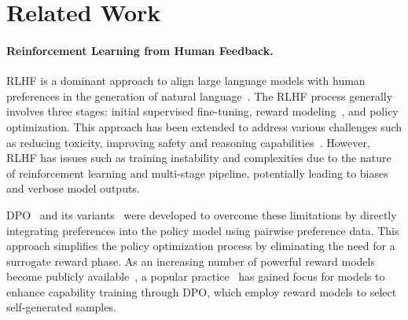 \section{Related Work}

\paragraph{Reinforcement Learning from Human Feedback.} 
RLHF is a dominant approach to align large language models with human preferences in the generation of natural language~\cite{NEURIPS2022_b1efde53, touvron2023llama2openfoundation}. 
The RLHF process generally involves three stages: initial supervised fine-tuning, reward modeling~\cite{lambert2024rewardbenchevaluatingrewardmodels}, and policy optimization. 
This approach has been extended to address various challenges such as reducing toxicity, improving safety and reasoning capabilities~\cite{qi2024safetyalignmentjusttokens, wu2023finegrained, dai2024safe, yu2024metamath}. 
However, RLHF has issues such as training instability and complexities due to the nature of reinforcement learning and multi-stage pipeline, potentially leading to biases and verbose model outputs.

DPO~\cite{rafailov2023direct} and its variants~\cite{meng2024simpo, pmlr-v235-ethayarajh24a, han2024fpogeneralizingpreferenceoptimization} were developed to overcome these limitations by directly integrating preferences into the policy model using pairwise preference data. 
This approach simplifies the policy optimization process by eliminating the need for a surrogate reward phase.
As an increasing number of powerful reward models become publicly available~\cite{jiang-etal-2023-llm, wang-etal-2024-interpretable, wang2024arithmetic, liu2024skyworkrewardbagtricksreward}, a popular practice~\cite{dong2023raft, liu2024statistical, meng2024simpo, ye-ng-2024-preference} has gained focus for models to enhance capability training through DPO, which employ reward models to select self-generated samples.


